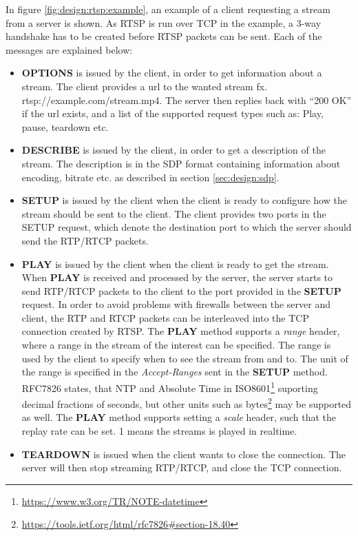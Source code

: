 In figure \ref{fig:design:rtsp:example}, an example of a client requesting a stream from a server is shown. As RTSP is run over TCP in the example, a 3-way handshake has to be created before RTSP packets can be sent.
Each of the messages are explained below:
\begin{itemize}
	\item \textbf{OPTIONS} is issued by the client, in order to get information about a stream. The client provides a url to the wanted stream fx. rtsp://example.com/stream.mp4. The server then replies back with ``200 OK'' if the url exists, and a list of the supported request types such as: Play, pause, teardown etc.
	
	\item \textbf{DESCRIBE} is issued by the client, in order to get a description of the stream. The description is in the SDP format containing information about encoding, bitrate etc. as described in section \ref{sec:design:sdp}.
	
	\item \textbf{SETUP} is issued by the client when the client is ready to configure how the stream should be sent to the client. The client provides two ports in the SETUP request, which denote the destination port to which the server should send the RTP/RTCP packets.
	
	\item \textbf{PLAY} is issued by the client when the client is ready to get the stream.
When \textbf{PLAY} is received and processed by the server, the server starts to send RTP/RTCP packets to the client to the port provided in the \textbf{SETUP} request.
In order to avoid problems with firewalls between the server and client, the RTP and RTCP packets can be interleaved into the TCP connection created by RTSP.
The \textbf{PLAY} method supports a \textit{range} header, where a range in the stream of the interest can be specified.
The range is used by the client to specify when to see the stream from and to. 
The unit of the range is specified in the \textit{Accept-Ranges} sent in the \textbf{SETUP} method. RFC7826 states, that \ac{NTP} and Absolute Time in ISO8601\footnote{\url{https://www.w3.org/TR/NOTE-datetime}} suporting decimal fractions of seconds, but other units such as bytes\footnote{\url{https://tools.ietf.org/html/rfc7826\#section-18.40}} may be supported as well. The \textbf{PLAY} method supports setting a \textit{scale} header, such that the replay rate can be set. 1 means the streams is played in realtime.
	\item \textbf{TEARDOWN} is issued when the client wants to close the connection. The server will then stop streaming RTP/RTCP, and close the TCP connection.
\end{itemize}

